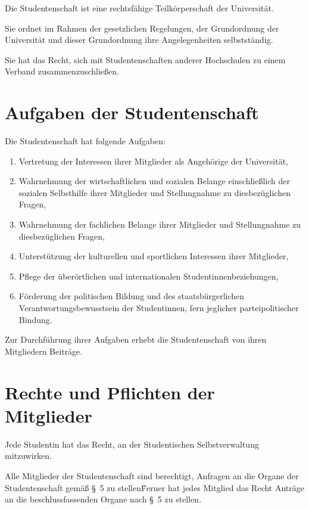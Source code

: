 \begin{multicols}{2}
\Abs \Satz Die Studentenschaft ist eine rechtsfähige Teilkörperschaft der Universität.
  
\Abs \Satz Sie ordnet im Rahmen der gesetzlichen Regelungen, der Grundordnung der Universität und dieser Grundordnung ihre Angelegenheiten selbstständig.
  
\Abs \Satz Sie hat das Recht, sich mit Studentenschaften anderer Hochschulen zu einem Verband zusammenzuschließen.



\section{Aufgaben der Studentenschaft}

\Abs \Satz Die Studentenschaft hat folgende Aufgaben:
\begin{enumerate}
\item Vertretung der Interessen ihrer Mitglieder als Angehörige der Universität,
\item Wahrnehmung der wirtschaftlichen und sozialen Belange einschließlich der sozialen Selbsthilfe ihrer Mitglieder und Stellungnahme zu diesbezüglichen Fragen,
\item Wahrnehmung der fachlichen Belange ihrer Mitglieder und Stellungnahme zu diesbezüglichen Fragen,
\item Unterstützung der kulturellen und sportlichen Interessen ihrer Mitglieder,
\item Pflege der überörtlichen und internationalen Studentinnenbeziehungen,
\item Förderung der politischen Bildung und des staatsbürgerlichen Verantwortungsbewusstsein der Studentinnen, fern jeglicher parteipolitischer Bindung.
\end{enumerate}

\Abs \Satz Zur Durchführung ihrer Aufgaben erhebt die Studentenschaft von ihren Mitgliedern Beiträge.



\section{Rechte und Pflichten der Mitglieder}
\Abs \Satz Jede Studentin hat das Recht, an der Studentischen Selbstverwaltung mitzuwirken.

\Abs \Satz Alle Mitglieder der Studentenschaft sind berechtigt, Anfragen an die Organe der Studentenschaft gemäß §~5 zu stellen\. Ferner hat jedes Mitglied das Recht Anträge an die beschlussfassenden Organe nach §~5 zu stellen.


\end{multicols}
